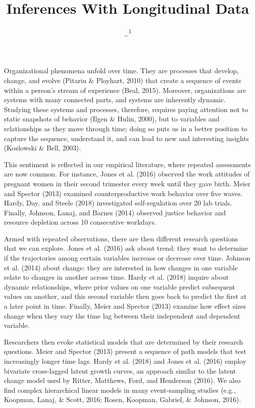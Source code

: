 \documentclass[english,,man]{apa6}
\title{Inferences With Longitudinal Data}
\author{\ldots{}\textsuperscript{1}}
\date{}
\affiliation{
\vspace{0.5cm}
\textsuperscript{1} ...}
\theoremstyle{definition}
\theoremstyle{definition}
\theoremstyle{definition}
\theoremstyle{remark}
\begin{document}
\maketitle

Organizational phenomena unfold over time. They are processes that
develop, change, and evolve (Pitariu \& Ployhart, 2010) that create a
sequence of events within a person's stream of experience (Beal, 2015).
Moreover, organizations are systems with many connected parts, and
systems are inherently dynamic. Studying these systems and processes,
therefore, requires paying attention not to static snapshots of behavior
(Ilgen \& Hulin, 2000), but to variables and relationships as they move
through time; doing so puts us in a better position to capture the
sequence, understand it, and can lead to new and interesting insights
(Kozlowski \& Bell, 2003).

This sentiment is reflected in our empirical literature, where repeated
assessments are now common. For instance, Jones et al. (2016) observed
the work attitudes of pregnant women in their second trimester every
week until they gave birth. Meier and Spector (2013) examined
counterproductive work behavior over five waves. Hardy, Day, and Steele
(2018) investigated self-regulation over 20 lab trials. Finally,
Johnson, Lanaj, and Barnes (2014) observed justice behavior and resource
depletion across 10 consecutive workdays.

Armed with repeated observations, there are then different research
questions that we can explore. Jones et al. (2016) ask about trend: they
want to determine if the trajectories among certain variables increase
or decrease over time. Johnson et al. (2014) about change: they are
interested in how changes in one variable relate to changes in another
across time. Hardy et al. (2018) inquire about dynamic relationships,
where prior values on one variable predict subsequent values on another,
and this second variable then goes back to predict the first at a later
point in time. Finally, Meier and Spector (2013) examine how effect
sizes change when they vary the time lag between their independent and
dependent variable.

Researchers then evoke statistical models that are determined by their
research questions. Meier and Spector (2013) present a sequence of path
models that test increasingly longer time lags. Hardy et al. (2018) and
Jones et al. (2016) employ bivariate cross-lagged latent growth curves,
an approach similar to the latent change model used by Ritter, Matthews,
Ford, and Henderson (2016). We also find complex hierarchical linear
models in many event-sampling studies (e.g., Koopman, Lanaj, \& Scott,
2016; Rosen, Koopman, Gabriel, \& Johnson, 2016).
\end{document}
